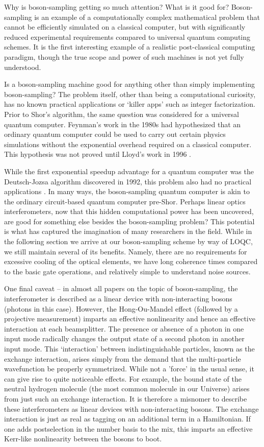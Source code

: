 \documentclass[aps,pra,twocolumn,amsmath,amssymb,nofootinbib,superscriptaddress]{revtex4}
\begin{document}
Why is boson-sampling getting so much attention?  What is it good for? Boson-sampling is an example of a computationally complex mathematical problem that cannot be efficiently simulated on a classical computer, but with significantly reduced experimental requirements compared to universal quantum computing schemes. It is the first interesting example of a realistic post-classical computing paradigm, though the true scope and power of such machines is not yet fully understood. 

Is a boson-sampling machine good for anything other than simply implementing boson-sampling? The problem itself, other than being a computational curiosity, has no known practical applications or `killer apps' such as integer factorization. Prior to Shor's algorithm, the same question was considered for a universal quantum computer.  Feynman's work in the 1980s had hypothesized that an ordinary quantum computer could be used to carry out certain physics simulations without the exponential overhead required on a classical computer.  This hypothesis was not proved until Lloyd's work in 1996 \cite{feyn,lloyd}.

While the first exponential speedup advantage for a quantum computer was the Deutsch-Jozsa algorithm discovered in 1992, this problem also had no practical applications \cite{deutsch}. In many ways, the boson-sampling quantum computer is akin to the ordinary circuit-based quantum computer pre-Shor.  Perhaps linear optics interferometers, now that this hidden computational power has been uncovered, are good for something else besides the boson-sampling problem? This potential is what has captured the imagination of many researchers in the field. While in the following section we arrive at our boson-sampling scheme by way of LOQC, we still maintain several of its benefits.  Namely, there are no requirements for excessive cooling of the optical elements, we have long coherence times compared to the basic gate operations, and relatively simple to understand noise sources.

One final caveat -- in almost all papers on the topic of boson-sampling, the interferometer is described as a linear device with non-interacting bosons (photons in this case). However, the Hong-Ou-Mandel effect (followed by a projective measurement) imparts an effective nonlinearity and hence an effective interaction at each beamsplitter. The presence or absence of a photon in one input mode radically changes the output state of a second photon in another input mode. This `interaction' between indistinguishable particles, known as the exchange interaction, arises simply from the demand that the multi-particle wavefunction be properly symmetrized. While not a 'force' in the usual sense, it can give rise to quite noticeable effects. For example, the bound state of the neutral hydrogen molecule (the most common molecule in our Universe) arises from just such an exchange interaction. It is therefore a misnomer to describe these interferometers as linear devices with non-interacting bosons. The exchange interaction is just as real as tagging on an additional term in a Hamiltonian.  If one adds postselection in the number basis to the mix, this imparts an effective Kerr-like nonlinearity between the bosons to boot.   
\end{document}
